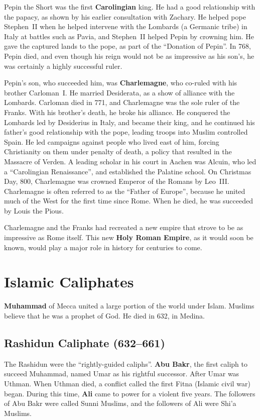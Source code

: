 Pepin the Short was the first \textbf{Carolingian} king.
He had a good relationship with the papacy, as shown by his earlier consultation with Zachary.
He helped pope Stephen~II when he helped intervene with the Lombards (a Germanic tribe)
in Italy at battles such as Pavia,
and Stephen~II helped Pepin by crowning him.
He gave the captured lands to the pope, as part of the ``Donation of Pepin''.
In 768, Pepin died, and even though his reign would not be as impressive as his son's,
he was certainly a highly successful ruler.

Pepin's son, who succeeded him, was \textbf{Charlemagne}, who co-ruled with his brother Carloman~I.
He married Desiderata, as a show of alliance with the Lombards.
Carloman died in 771, and Charlemagne was the sole ruler of the Franks.
With his brother's death, he broke his alliance.
He conquered the Lombards led by Desiderius in Italy, and became their king,
and he continued his father's good relationship with the pope,
leading troops into Muslim controlled Spain.
He led campaigns against people who lived east of him, forcing Christianity on them under penalty of death,
a policy that resulted in the Massacre of Verden.
A leading scholar in his court in Aachen was Alcuin,
who led a ``Carolingian Renaissance'', and established the Palatine school.
On Christmas Day, 800, Charlemagne was crowned Emperor of the Romans by Leo~III\@.
Charlemagne is often referred to as the ``Father of Europe'',
because he united much of the West for the first time since Rome.
When he died, he was succeeded by Louis the Pious.

Charlemagne and the Franks had recreated a new empire that strove to be as impressive as Rome itself.
This new \textbf{Holy Roman Empire}, as it would soon be known,
would play a major role in history for centuries to come.

\section{Islamic Caliphates}

\textbf{Muhammad} of Mecca united a large portion of the world under Islam.
Muslims believe that he was a prophet of God.
He died in 632, in Medina.

\subsection*{Rashidun Caliphate (632--661)}

The Rashidun were the ``rightly-guided caliphs''.
\textbf{Abu Bakr}, the first caliph to succeed Muhammad, named Umar as his rightful successor.
After Umar was Uthman.
When Uthman died, a conflict called the first Fitna (Islamic civil war) began.
During this time, \textbf{Ali} came to power for a violent five years.
The followers of Abu Bakr were called Sunni Muslims, and the followers of Ali were Shi'a Muslims.

